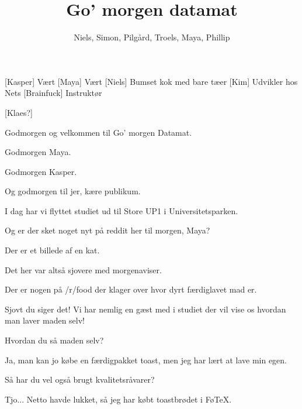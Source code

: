 \documentclass[a4paper,11pt]{article}
\title{Go' morgen datamat}
\author{Niels, Simon, Pilgård, Troels, Maya, Phillip}
\begin{document}
\maketitle

\begin{roles}
[Kasper] Vært
[Maya] Vært
[Niels] Bumset kok med bare tæer
[Kim] Udvikler hos Nets
[Brainfuck] Instruktør
\end{roles}

\begin{props}
[Klaes?]
\end{props}


\begin{sketch}


 Godmorgen og velkommen til Go' morgen Datamat.

 Godmorgen Maya.

 Godmorgen Kasper.

 Og godmorgen til jer, kære publikum.

 I dag har vi flyttet studiet ud til Store UP1 i Universitetsparken.


 Og er der sket noget nyt på reddit her til morgen, Maya?

 Der er et billede af en kat.


 Det her var altså sjovere med morgenaviser.

 Der er nogen på /r/food der klager over hvor dyrt færdiglavet mad er.

 Sjovt du siger det!  Vi har nemlig en gæst med i studiet der vil vise os hvordan man laver maden selv!


 Hvordan du så maden selv?

 Ja, man kan jo købe en færdigpakket toast, men jeg har lært
at lave min egen.

 Så har du vel også brugt kvalitetsråvarer?

 Tjo... Netto havde lukket, så jeg har købt toastbrødet i FøTeX.


\end{sketch}
\end{document}
